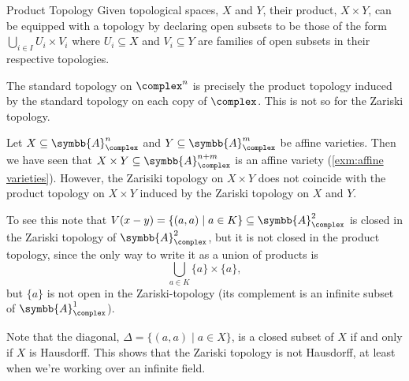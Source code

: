 \documentclass[fleqn]{NotesClass}
\newcommand{\affine}{\symbb{A}}
\begin{document}
    \begin{exm}{Product Topology}{}
        Given topological spaces, \(X\) and \(Y\), their product, \(X \times Y\), can be equipped with a topology by declaring open subsets to be those of the form \(\bigcup_{i \in I} U_i \times V_i\) where \(U_i \subseteq X\) and \(V_i \subseteq Y\) are families of open subsets in their respective topologies.
        
        The standard topology on \(\complex^n\) is precisely the product topology induced by the standard topology on each copy of \(\complex\).
        This is not so for the Zariski topology.
        
        Let \(X \subseteq \affine_{\complex}^n\) and \(Y \subseteq \affine_{\complex}^m\) be affine varieties.
        Then we have seen that \(X \times Y \subseteq \affine_{\complex}^{n+m}\) is an affine variety (\cref{exm:affine varieties}).
        However, the Zarisiki topology on \(X \times Y\) does not coincide with the product topology on \(X \times Y\) induced by the Zariski topology on \(X\) and \(Y\).
        
        To see this note that \(V(x - y) = \{(a, a) \mid a \in K\} \subseteq \affine_{\complex}^2\) is closed in the Zariski topology of \(\affine_{\complex}^2\), but it is not closed in the product topology, since the only way to write it as a union of products is
        \begin{equation}
            \bigcup_{a \in K} \{a\} \times \{a\},
        \end{equation}
        but \(\{a\}\) is not open in the Zariski-topology (its complement is an infinite subset of \(\affine_{\complex}^1\)).
    \end{exm}
    
    Note that the diagonal, \(\Delta = \{(a, a) \mid a \in X\}\), is a closed subset of \(X\) if and only if \(X\) is Hausdorff.
    This shows that the Zariski topology is not Hausdorff, at least when we're working over an infinite field.
    
    \appendixpage
    \begin{appendices}
        
    \end{appendices}
    \backmatter
    \renewcommand{\glossaryname}{Acronyms}
    \printglossary[acronym]
    \printindex
\end{document}
